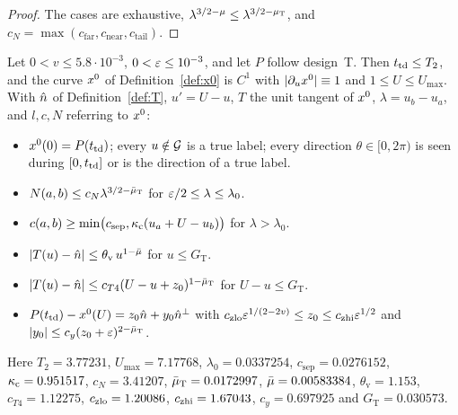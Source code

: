 \begin{proof}
The cases are exhaustive, $\lambda^{3/2-\mu}\le\lambda^{3/2-\mu_{\mathrm T}}$, and $c_N=\max(c_{\mathrm{far}},c_{\mathrm{near}},c_{\mathrm{tail}})$.
\end{proof}

\begin{theorem}\label{thm:touchdown}
Let $0<v\le5.8\cdot10^{-3}$, $0<\varepsilon\le10^{-3}$, and let $P$ follow design~T. Then $t_{\mathrm{td}}\le T_2$, and the curve $x^0$ of
Definition~\ref{def:x0} is $C^1$ with $|\partial_ux^0|\equiv1$ and $1\le U\le U_{\max}$. With $\hat n$ of Definition~\ref{def:T},
$u'=U-u$, $T$ the unit tangent of $x^0$, $\lambda=u_b-u_a$, and $l,c,N$ referring to $x^0$:
\begin{itemize}
\item[\textup{(T0)}] $x^0(0)=P(t_{\mathrm{td}})$; every $u\notin\mathcal G$ is a true label; every direction $\theta\in[0,2\pi)$ is seen during $[0,t_{\mathrm{td}}]$
or is the direction of a true label.
\item[\textup{(T1)}] $N(a,b)\le c_N\lambda^{3/2-\bar\mu_{\mathrm T}}$ for $\varepsilon/2\le\lambda\le\lambda_0$.
\item[\textup{(T2)}] $c(a,b)\ge\min\bigl(c_{\mathrm{sep}},\kappa_{\mathrm c}(u_a+U-u_b)\bigr)$ for $\lambda>\lambda_0$.
\item[\textup{(T3)}] $|T(u)-\hat n|\le\theta_{\mathrm v}\,u^{1-\bar\mu}$ for $u\le G_{\mathrm T}$.
\item[\textup{(T4)}] $|T(u)-\hat n|\le c_{T4}(U-u+z_0)^{1-\bar\mu_{\mathrm T}}$ for $U-u\le G_{\mathrm T}$.
\item[\textup{(T5)}] $P(t_{\mathrm{td}})-x^0(U)=z_0\hat n+y_0\hat n^\perp$ with $c_{\mathrm{zlo}}\varepsilon^{1/(2-2v)}\le z_0\le c_{\mathrm{zhi}}\varepsilon^{1/2}$ and
$|y_0|\le c_y(z_0+\varepsilon)^{2-\bar\mu_{\mathrm T}}$.
\end{itemize}
Here $T_2=3.77231$, $U_{\max}=7.17768$, $\lambda_0=0.0337254$, $c_{\mathrm{sep}}=0.0276152$, $\kappa_{\mathrm c}=0.951517$, $c_N=3.41207$,
$\bar\mu_{\mathrm T}=0.0172997$, $\bar\mu=0.00583384$, $\theta_{\mathrm v}=1.153$, $c_{T4}=1.12275$, $c_{\mathrm{zlo}}=1.20086$, $c_{\mathrm{zhi}}=1.67043$,
$c_y=0.697925$ and $G_{\mathrm T}=0.030573$.
\end{theorem}

